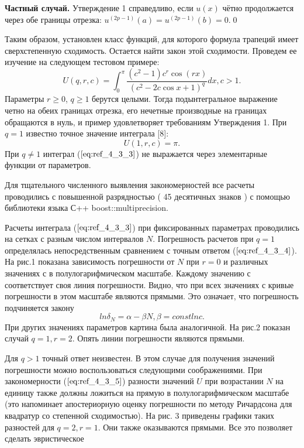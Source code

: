 \textbf{Частный случай.} Утверждение 1 справедливо, если $u(x)$ чётно
продолжается через обе границы отрезка: $u^{(2p-1)}(a)=u^{(2p-1)}(b)=0$.\qed

Таким образом, установлен класс функций, для которого формула
трапеций имеет сверхстепенную сходимость. Остается найти закон этой
сходимости. Проведем ее изучение на следующем тестовом примере:
\begin{equation}
U(q,r,c) = \int_0^{\pi} \frac{(c^2-1)c^r\cos (rx)}{(c^2-2c\cos x+1)^q}dx,c>1.
\label{eq:ref_4_3_3}
\end{equation}
Параметры $r \geqslant 0$, $q \geqslant 1$ берутся целыми. Тогда подынтегральное выражение
четно на обеих границах отрезка, его нечетные производные на границах
обращаются в нуль, и пример удовлетворяет требованиям Утверждения 1. При
$q = 1$ известно точное значение интеграла [8]:
\begin{equation}
U(1,r,c) = \pi.
\label{eq:ref_4_3_4}
\end{equation}
При $q \ne 1$ интеграл ($\ref{eq:ref_4_3_3}$) не выражается через элементарные функции от
параметров.

Для тщательного численного выявления закономерностей все расчеты
проводились с повышенной разрядностью ( 45 десятичных знаков ) с помощью
библиотеки языка С++ boost::multiprecision.

Расчеты интеграла ($\ref{eq:ref_4_3_3}$) при фиксированных параметрах проводились на
сетках с разным числом интервалов $N$. Погрешность расчетов при $q =1$
определялась непосредственным сравнением с точным ответом ($\ref{eq:ref_4_3_4}$). На рис.1
показана зависимость погрешности от $N$ при $r = 0$ и различных значениях с в
полулогарифмическом масштабе. Каждому значению с соответствует своя
линия погрешности. Видно, что при всех значениях с кривые погрешности в
этом масштабе являются прямыми. Это означает, что погрешность подчиняется
закону
\begin{equation}
ln \delta_N = \alpha - \beta N, \beta = const lnc.
\label{eq:ref_4_3_5}
\end{equation}
При других значениях параметров картина была аналогичной. На рис.2 показан
случай $q =1,r = 2$. Опять линии погрешности являются прямыми.

Для $q >1$ точный ответ неизвестен. В этом случае для получения значений
погрешности можно воспользоваться следующими соображениями. При
закономерности ($\ref{eq:ref_4_3_5}$) разности значений $U$ при возрастании $N$ на единицу
также должны ложиться на прямую в полулогарифмическом масштабе (это
напоминает апостериорную оценку погрешности по методу Ричардсона для
квадратур со степенной сходимостью). На рис. 3 приведены графики таких
разностей для $q = 2,r = 1$. Они также оказываются прямыми. Все это позволяет
сделать эвристическое

